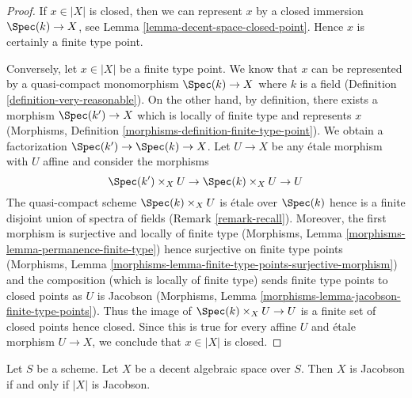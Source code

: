 \begin{proof}
If $x \in |X|$ is closed, then we can represent $x$ by a closed
immersion $\Spec(k) \to X$, see Lemma \ref{lemma-decent-space-closed-point}.
Hence $x$ is certainly a finite type point.

\medskip\noindent
Conversely, let $x \in |X|$ be a finite type point. We know that
$x$ can be represented by a quasi-compact monomorphism
$\Spec(k) \to X$ where $k$ is a field
(Definition \ref{definition-very-reasonable}). On the other hand,
by definition, there exists a morphism $\Spec(k') \to X$
which is locally of finite type and represents $x$
(Morphisms, Definition \ref{morphisms-definition-finite-type-point}).
We obtain a factorization $\Spec(k') \to \Spec(k) \to X$.
Let $U \to X$ be any \'etale morphism with $U$ affine and consider
the morphisms
$$
\Spec(k') \times_X U \to \Spec(k) \times_X U \to U
$$
The quasi-compact scheme $\Spec(k) \times_X U$ is \'etale over
$\Spec(k)$ hence is a finite disjoint union
of spectra of fields (Remark \ref{remark-recall}).
Moreover, the first morphism is surjective and locally of finite type
(Morphisms, Lemma \ref{morphisms-lemma-permanence-finite-type})
hence surjective on finite type points
(Morphisms, Lemma \ref{morphisms-lemma-finite-type-points-surjective-morphism})
and the composition (which is locally of finite type) sends
finite type points to closed points as $U$ is Jacobson
(Morphisms, Lemma \ref{morphisms-lemma-jacobson-finite-type-points}).
Thus the image of
$\Spec(k) \times_X U \to U$ is a finite set of closed points hence
closed. Since this is true for every affine $U$ and \'etale morphism
$U \to X$, we conclude that $x \in |X|$ is closed.
\end{proof}

\begin{lemma}
\label{lemma-decent-Jacobson}
Let $S$ be a scheme. Let $X$ be a decent algebraic space over $S$.
Then $X$ is Jacobson if and only if $|X|$ is Jacobson.
\end{lemma}

